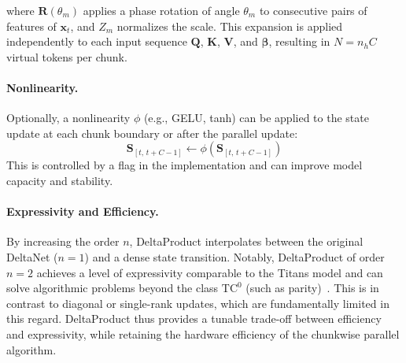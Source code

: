 \documentclass[10pt,a4paper]{article}
\begin{document}
where $\mathbf{R}(\theta_m)$ applies a phase rotation of angle $\theta_m$ to consecutive pairs of features of $\mathbf{x}_t$, and $Z_m$ normalizes the scale. This expansion is applied independently to each input sequence $\mathbf{Q}$, $\mathbf{K}$, $\mathbf{V}$, and $\boldsymbol{\beta}$, resulting in $N = n_h C$ virtual tokens per chunk.



\paragraph{Nonlinearity.}

Optionally, a nonlinearity $\phi$ (e.g., GELU, tanh) can be applied to the state update at each chunk boundary or after the parallel update:
\begin{equation}
    \mathbf{S}_{[t,\,t+C-1]} \leftarrow \phi(\mathbf{S}_{[t,\,t+C-1]})
\end{equation}
This is controlled by a flag in the implementation and can improve model capacity and stability.

\paragraph{Expressivity and Efficiency.}

By increasing the order $n$, DeltaProduct interpolates between the original DeltaNet ($n=1$) and a dense state transition. Notably, DeltaProduct of order $n=2$ achieves a level of expressivity comparable to the Titans model and can solve algorithmic problems beyond the class $\mathrm{TC}^0$ (such as parity)~\cite{siems2025deltaproduct, merrill2024illusion}. This is in contrast to diagonal or single-rank updates, which are fundamentally limited in this regard. DeltaProduct thus provides a tunable trade-off between efficiency and expressivity, while retaining the hardware efficiency of the chunkwise parallel algorithm.


\end{document}
